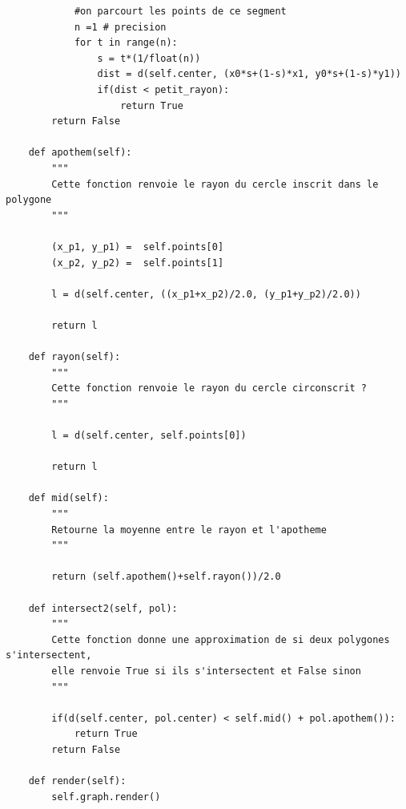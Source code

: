 \documentclass{book}
\begin{document}
\begin{appendices}
\begin{lstlisting}
            #on parcourt les points de ce segment
            n =1 # precision
            for t in range(n):
                s = t*(1/float(n))
                dist = d(self.center, (x0*s+(1-s)*x1, y0*s+(1-s)*y1))
                if(dist < petit_rayon):
                    return True
        return False
    
    def apothem(self):
        """
        Cette fonction renvoie le rayon du cercle inscrit dans le polygone
        """
         
        (x_p1, y_p1) =  self.points[0]
        (x_p2, y_p2) =  self.points[1]
        
        l = d(self.center, ((x_p1+x_p2)/2.0, (y_p1+y_p2)/2.0))
        
        return l
    
    def rayon(self):
        """
        Cette fonction renvoie le rayon du cercle circonscrit ?
        """
        
        l = d(self.center, self.points[0])
        
        return l

    def mid(self):
        """
        Retourne la moyenne entre le rayon et l'apotheme
        """
        
        return (self.apothem()+self.rayon())/2.0
        
    def intersect2(self, pol):
        """
        Cette fonction donne une approximation de si deux polygones s'intersectent,
        elle renvoie True si ils s'intersectent et False sinon
        """
        
        if(d(self.center, pol.center) < self.mid() + pol.apothem()):
            return True
        return False

    def render(self):
        self.graph.render()
\end{lstlisting}
\end{appendices}


\printbibliography %
\end{document}
